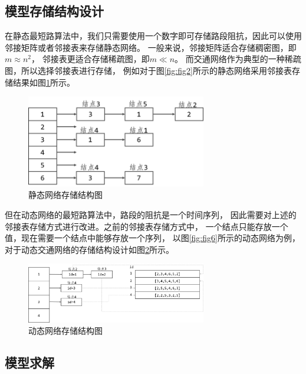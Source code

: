 \subsection{模型存储结构设计}\label{subsec:模型存储结构设计}
在静态最短路算法中，我们只需要使用一个数字即可存储路段阻抗，因此可以使用邻接矩阵或者邻接表来存储静态网络。
一般来说，邻接矩阵适合存储稠密图，即$m\approx n^2$，
邻接表更适合存储稀疏图，即$m \ll n$。
而交通网络作为典型的一种稀疏图，所以选择邻接表进行存储，
例如对于图\ref{fig:fig2}所示的静态网络采用邻接表存储结果如图\ref{fig:fig13}所示。
\begin{figure}[H] %
    \centering %
    \includegraphics[width=0.7\textwidth]{png/图片13静态网络存储结构图} %
    \caption{静态网络存储结构图} %
    \label{fig:fig13} %
\end{figure}

但在动态网络的最短路算法中，路段的阻抗是一个时间序列，
因此需要对上述的邻接表存储方式进行改进。之前的邻接表存储方式中，
一个结点只能存放一个值，现在需要一个结点中能够存放一个序列，
以图\ref{fig:fig6}所示的动态网络为例，对于动态交通网络的存储结构设计如图\ref{fig:fig14}所示。
\begin{figure}[H] %
    \centering %
    \includegraphics[width=0.7\textwidth]{png/图片14动态网络存储结构图} %
    \caption{动态网络存储结构图} %
    \label{fig:fig14} %
\end{figure}

\subsection{模型求解}\label{subsec:模型求解}


